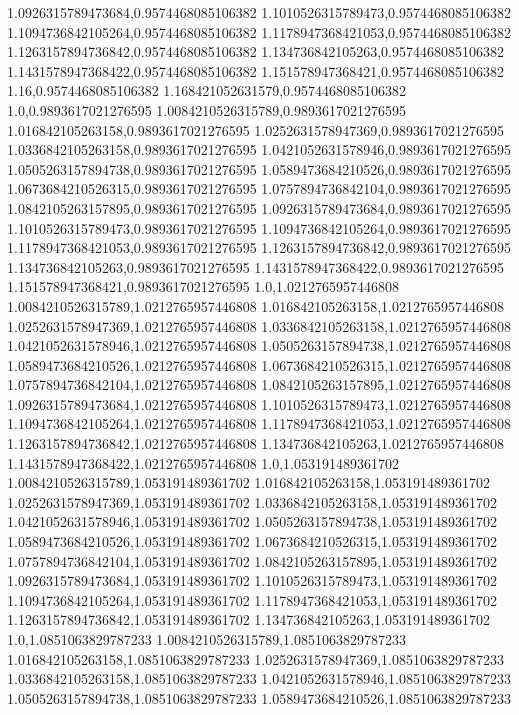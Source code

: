 1.0926315789473684,0.9574468085106382
1.1010526315789473,0.9574468085106382
1.1094736842105264,0.9574468085106382
1.1178947368421053,0.9574468085106382
1.1263157894736842,0.9574468085106382
1.134736842105263,0.9574468085106382
1.1431578947368422,0.9574468085106382
1.151578947368421,0.9574468085106382
1.16,0.9574468085106382
1.168421052631579,0.9574468085106382
1.0,0.9893617021276595
1.0084210526315789,0.9893617021276595
1.016842105263158,0.9893617021276595
1.0252631578947369,0.9893617021276595
1.0336842105263158,0.9893617021276595
1.0421052631578946,0.9893617021276595
1.0505263157894738,0.9893617021276595
1.0589473684210526,0.9893617021276595
1.0673684210526315,0.9893617021276595
1.0757894736842104,0.9893617021276595
1.0842105263157895,0.9893617021276595
1.0926315789473684,0.9893617021276595
1.1010526315789473,0.9893617021276595
1.1094736842105264,0.9893617021276595
1.1178947368421053,0.9893617021276595
1.1263157894736842,0.9893617021276595
1.134736842105263,0.9893617021276595
1.1431578947368422,0.9893617021276595
1.151578947368421,0.9893617021276595
1.0,1.0212765957446808
1.0084210526315789,1.0212765957446808
1.016842105263158,1.0212765957446808
1.0252631578947369,1.0212765957446808
1.0336842105263158,1.0212765957446808
1.0421052631578946,1.0212765957446808
1.0505263157894738,1.0212765957446808
1.0589473684210526,1.0212765957446808
1.0673684210526315,1.0212765957446808
1.0757894736842104,1.0212765957446808
1.0842105263157895,1.0212765957446808
1.0926315789473684,1.0212765957446808
1.1010526315789473,1.0212765957446808
1.1094736842105264,1.0212765957446808
1.1178947368421053,1.0212765957446808
1.1263157894736842,1.0212765957446808
1.134736842105263,1.0212765957446808
1.1431578947368422,1.0212765957446808
1.0,1.053191489361702
1.0084210526315789,1.053191489361702
1.016842105263158,1.053191489361702
1.0252631578947369,1.053191489361702
1.0336842105263158,1.053191489361702
1.0421052631578946,1.053191489361702
1.0505263157894738,1.053191489361702
1.0589473684210526,1.053191489361702
1.0673684210526315,1.053191489361702
1.0757894736842104,1.053191489361702
1.0842105263157895,1.053191489361702
1.0926315789473684,1.053191489361702
1.1010526315789473,1.053191489361702
1.1094736842105264,1.053191489361702
1.1178947368421053,1.053191489361702
1.1263157894736842,1.053191489361702
1.134736842105263,1.053191489361702
1.0,1.0851063829787233
1.0084210526315789,1.0851063829787233
1.016842105263158,1.0851063829787233
1.0252631578947369,1.0851063829787233
1.0336842105263158,1.0851063829787233
1.0421052631578946,1.0851063829787233
1.0505263157894738,1.0851063829787233
1.0589473684210526,1.0851063829787233
